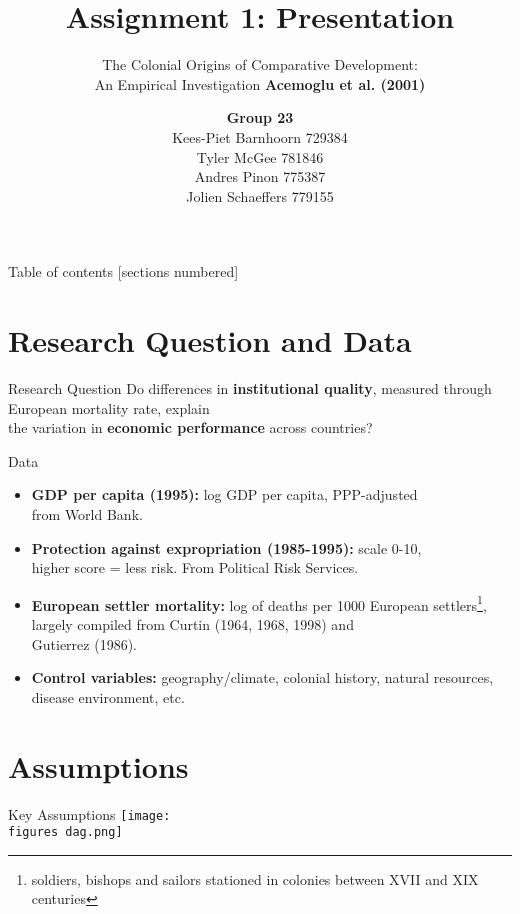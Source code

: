 \documentclass[10pt]{beamer}
\title{Assignment 1: Presentation}
\subtitle{The Colonial Origins of Comparative Development:\\An Empirical Investigation \textbf{Acemoglu et al. (2001)}}
\date{}
\author{\textbf{Group 23}\\Kees-Piet Barnhoorn 729384\\Tyler McGee 781846\\Andres Pinon 775387\\Jolien Schaeffers 779155}
\institute{FEM11087 Applied Microeconometrics}
\newcommand{\figures}{figures/}
\begin{document}
\maketitle

\begin{frame}{Table of contents}
  [sections numbered]
  \tableofcontents%
\end{frame}

\section{Research Question and Data}

\begin{frame}{Research Question}
  \Large{Do differences in \textbf{institutional quality}, measured through European mortality rate, explain\\the variation in \textbf{economic performance} across countries?}
\end{frame}

\begin{frame}{Data}
  \begin{itemize}
    \item \textbf{GDP per capita (1995):} log GDP per capita, PPP-adjusted\\from World Bank.
    \item \textbf{Protection against expropriation (1985-1995):} scale 0-10,\\higher score = less risk. From Political Risk Services.
    \item \textbf{European settler mortality:} log of deaths per 1000 European settlers\footnote{soldiers, bishops and sailors stationed in colonies between XVII and XIX centuries}, largely compiled from Curtin (1964, 1968, 1998) and\\Gutierrez (1986).
    \item \textbf{Control variables:} geography/climate, colonial history, natural resources, disease environment, etc.
  \end{itemize}
\end{frame}

\section{Assumptions}

\begin{frame}{Key Assumptions}
  \centering
  \vspace{1em}
  \texttt{[image: \\figures dag.png]}
\end{frame}
\end{document}
